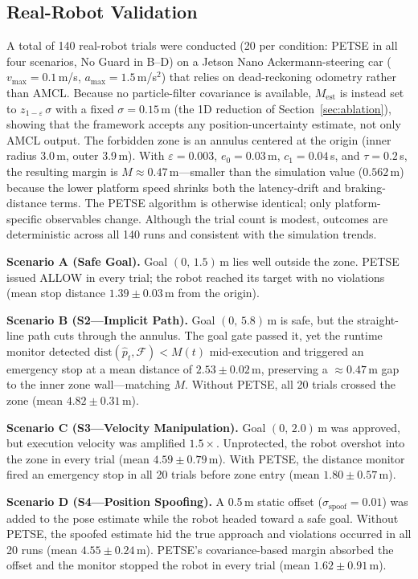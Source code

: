 \documentclass[journal,twoside,web]{ieeecolor}
\begin{document}
\subsection{Real-Robot Validation}\label{sec:real}
A total of 140 real-robot trials were conducted (20 per condition: PETSE in all four scenarios, No Guard in B--D) on a Jetson Nano Ackermann-steering car ($v_{\max}{=}0.1$\,m/s, $a_{\max}{=}1.5$\,m/s$^2$) that relies on dead-reckoning odometry rather than AMCL. Because no particle-filter covariance is available, $M_{\mathrm{est}}$ is instead set to $z_{1-\varepsilon}\,\sigma$ with a fixed $\sigma{=}0.15$\,m (the 1D reduction of Section~\ref{sec:ablation}), showing that the framework accepts any position-uncertainty estimate, not only AMCL output. The forbidden zone is an annulus centered at the origin (inner radius 3.0\,m, outer 3.9\,m). With $\varepsilon{=}0.003$, $e_0{=}0.03$\,m, $c_1{=}0.04$\,s, and $\tau{=}0.2$\,s, the resulting margin is $M{\approx}0.47$\,m---smaller than the simulation value ($0.562$\,m) because the lower platform speed shrinks both the latency-drift and braking-distance terms. The PETSE algorithm is otherwise identical; only platform-specific observables change. Although the trial count is modest, outcomes are deterministic across all 140 runs and consistent with the simulation trends.

\textbf{Scenario A (Safe Goal).} Goal $(0,\,1.5)$\,m lies well outside the zone. PETSE issued ALLOW in every trial; the robot reached its target with no violations (mean stop distance $1.39\pm0.03$\,m from the origin).

\textbf{Scenario B (S2---Implicit Path).} Goal $(0,\,5.8)$\,m is safe, but the straight-line path cuts through the annulus. The goal gate passed it, yet the runtime monitor detected $\mathrm{dist}(\hat{p}_t, \mathcal{F}) < M(t)$ mid-execution and triggered an emergency stop at a mean distance of $2.53\pm0.02$\,m, preserving a ${\approx}0.47$\,m gap to the inner zone wall---matching $M$. Without PETSE, all 20 trials crossed the zone (mean $4.82\pm0.31$\,m).

\textbf{Scenario C (S3---Velocity Manipulation).} Goal $(0,\,2.0)$\,m was approved, but execution velocity was amplified $1.5\times$. Unprotected, the robot overshot into the zone in every trial (mean $4.59\pm0.79$\,m). With PETSE, the distance monitor fired an emergency stop in all 20 trials before zone entry (mean $1.80\pm0.57$\,m).

\textbf{Scenario D (S4---Position Spoofing).} A 0.5\,m static offset ($\sigma_{\mathrm{spoof}}{=}0.01$) was added to the pose estimate while the robot headed toward a safe goal. Without PETSE, the spoofed estimate hid the true approach and violations occurred in all 20 runs (mean $4.55\pm0.24$\,m). PETSE's covariance-based margin absorbed the offset and the monitor stopped the robot in every trial (mean $1.62\pm0.91$\,m).
\end{document}
